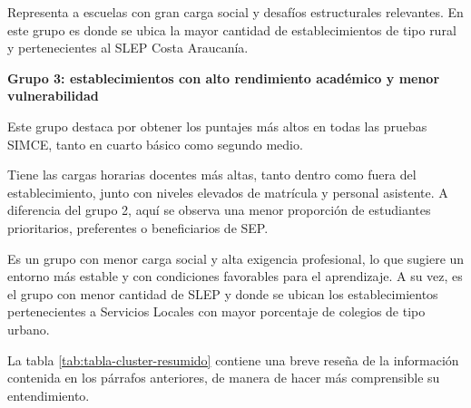 \documentclass[
  12pt,
  letterpaper,
]{article}
\begin{document}
Representa a escuelas con gran carga social y desafíos estructurales relevantes.
En este grupo es donde se ubica la mayor cantidad de establecimientos de tipo rural y pertenecientes al SLEP Costa Araucanía.

\textbf{Grupo 3: establecimientos con alto rendimiento académico y menor vulnerabilidad}

Este grupo destaca por obtener los puntajes más altos en todas las pruebas SIMCE, tanto en cuarto básico como segundo medio.

Tiene las cargas horarias docentes más altas, tanto dentro como fuera del establecimiento, junto con niveles elevados de matrícula y personal asistente.
A diferencia del grupo 2, aquí se observa una menor proporción de estudiantes prioritarios, preferentes o beneficiarios de SEP.

Es un grupo con menor carga social y alta exigencia profesional, lo que sugiere un entorno más estable y con condiciones favorables para el aprendizaje.
A su vez, es el grupo con menor cantidad de SLEP y donde se ubican los establecimientos pertenecientes a Servicios Locales con mayor porcentaje de colegios de tipo urbano.

La tabla \ref{tab:tabla-cluster-resumido} contiene una breve reseña de la información contenida en los párrafos anteriores, de manera de hacer más comprensible su entendimiento.

\begin{table}[!h]
\centering
\caption{\label{tab:tabla-cluster-resumido}Características resumidas de cada grupo}
\centering
{}
\end{table}
\end{document}

